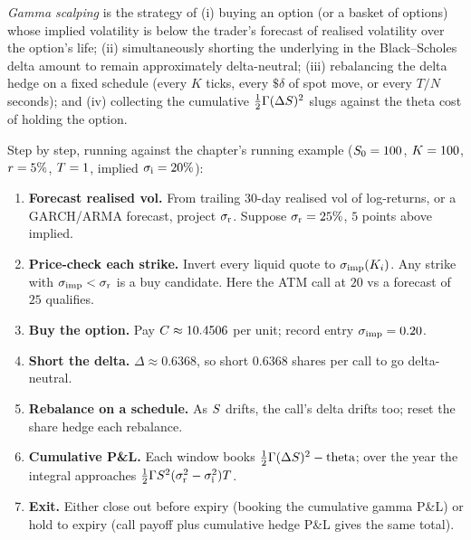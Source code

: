 \begin{definition}
\label{def:gamma_scalping}
\emph{Gamma scalping} is the strategy of (i) buying an option (or
a basket of options) whose implied volatility is below the
trader's forecast of realised volatility over the option's life;
(ii) simultaneously shorting the underlying in the Black--Scholes
delta amount to remain approximately delta-neutral; (iii)
rebalancing the delta hedge on a fixed schedule (every $K$ ticks,
every $\$\delta$ of spot move, or every $T/N$ seconds); and (iv)
collecting the cumulative
$\tfrac12 \Gamma (\Delta S)^2$ slugs against the theta cost of
holding the option.
\end{definition}

Step by step, running against the chapter's running example
($S_0 = 100$, $K = 100$, $r = 5\%$, $T = 1$,
implied $\sigma_{\text{i}} = 20\%$):

\begin{enumerate}
  \item \textbf{Forecast realised vol.} From trailing $30$-day
  realised vol of log-returns, or a GARCH/ARMA forecast, project
  $\sigma_{\text{r}}$. Suppose $\sigma_{\text{r}} = 25\%$, $5$
  points above implied.
  \item \textbf{Price-check each strike.} Invert every liquid
  quote to $\sigma_{\text{imp}}(K_i)$. Any strike with
  $\sigma_{\text{imp}} < \sigma_{\text{r}}$ is a buy candidate.
  Here the ATM call at $20$ vs a forecast of $25$ qualifies.
  \item \textbf{Buy the option.} Pay $C \approx 10.4506$ per
  unit; record entry $\sigma_{\text{imp}} = 0.20$.
  \item \textbf{Short the delta.} $\Delta \approx 0.6368$, so
  short $0.6368$ shares per call to go delta-neutral.
  \item \textbf{Rebalance on a schedule.} As $S$ drifts, the
  call's delta drifts too; reset the share hedge each rebalance.
  \item \textbf{Cumulative P\&L.} Each window books
  $\tfrac12 \Gamma (\Delta S)^2 - \text{theta}$; over the year
  the integral approaches
  $\tfrac12 \Gamma S^2 (\sigma_{\text{r}}^2 -
  \sigma_{\text{i}}^2) T$.
  \item \textbf{Exit.} Either close out before expiry (booking the
  cumulative gamma P\&L) or hold to expiry (call payoff plus
  cumulative hedge P\&L gives the same total).
\end{enumerate}

